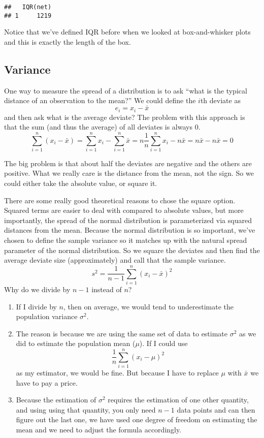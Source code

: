\documentclass[]{book}
\providecommand{\tightlist}{%
  \setlength{\itemsep}{0pt}\setlength{\parskip}{0pt}}
\begin{document}
\begin{verbatim}
##   IQR(net)
## 1     1219
\end{verbatim}

Notice that we've defined IQR before when we looked at box-and-whisker
plots and this is exactly the length of the box.

\subsection{Variance}\label{variance}

One way to measure the spread of a distribution is to ask ``what is the
typical distance of an observation to the mean?'' We could define the
\(i\)th deviate as \[e_{i}=x_{i}-\bar{x}\] and then ask what is the
average deviate? The problem with this approach is that the sum (and
thus the average) of all deviates is always 0.
\[\sum_{i=1}^{n}(x_{i}-\bar{x}) =   \sum_{i=1}^{n}x_{i}-\sum_{i=1}^{n}\bar{x}
    =   n\frac{1}{n}\sum_{i=1}^{n}x_{i}-n\bar{x}
    =   n\bar{x}-n\bar{x}
    =   0\]

The big problem is that about half the deviates are negative and the
others are positive. What we really care is the distance from the mean,
not the sign. So we could either take the absolute value, or square it.

There are some really good theoretical reasons to chose the square
option. Squared terms are easier to deal with compared to absolute
values, but more importantly, the spread of the normal distribution is
parameterized via squared distances from the mean. Because the normal
distribution is so important, we've chosen to define the sample variance
so it matches up with the natural spread parameter of the normal
distribution. So we square the deviates and then find the average
deviate size (approximately) and call that the sample variance.
\[s^{2}=\frac{1}{n-1}\sum_{i=1}^{n}\left(x_{i}-\bar{x}\right)^{2}\] Why
do we divide by \(n-1\) instead of \(n\)?

\begin{enumerate}
\def\labelenumi{\arabic{enumi}.}
\tightlist
\item
  If I divide by \(n\), then on average, we would tend to underestimate
  the population variance \(\sigma^{2}\).
\item
  The reason is because we are using the same set of data to estimate
  \(\sigma^{2}\) as we did to estimate the population mean (\(\mu\)). If
  I could use\\
  \[\frac{1}{n}\sum_{i=1}^{n}\left(x_{i}-\mu\right)^{2}\] as my
  estimator, we would be fine. But because I have to replace \(\mu\)
  with \(\bar{x}\) we have to pay a price.
\item
  Because the estimation of \(\sigma^{2}\) requires the estimation of
  one other quantity, and using using that quantity, you only need
  \(n-1\) data points and can then figure out the last one, we have used
  one degree of freedom on estimating the mean and we need to adjust the
  formula accordingly.
\end{enumerate}
\end{document}
